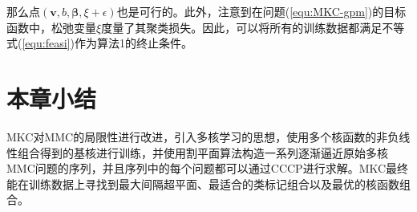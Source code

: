 那么点$(\mathbf{v},b,\mathbf{\beta},\xi+\epsilon)$也是可行的。此外，注意到在问题(\ref{equ:MKC-gpm})的目标函数中，松弛变量$\xi$度量了其聚类损失。因此，可以将所有的训练数据都满足不等式(\ref{equ:feasi})作为算法1的终止条件。

\section{本章小结}
MKC对MMC的局限性进行改进，引入多核学习的思想，使用多个核函数的非负线性组合得到的基核进行训练，并使用割平面算法构造一系列逐渐逼近原始多核MMC问题的序列，并且序列中的每个问题都可以通过CCCP进行求解。MKC最终能在训练数据上寻找到最大间隔超平面、最适合的类标记组合以及最优的核函数组合。